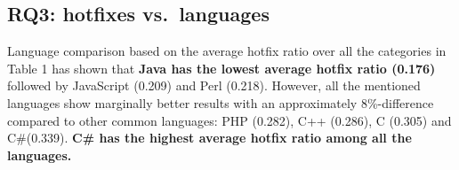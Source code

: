 \documentclass{sig-alternate}
\begin{document}



\subsection{RQ3: hotfixes vs.\ languages}
Language comparison based on the average hotfix ratio over all the categories in Table 1 has shown that \textbf{Java has the lowest average hotfix ratio (0.176)} followed by JavaScript (0.209) and Perl (0.218). However, all the mentioned languages show marginally better results with an approximately 8\%-difference compared to other common languages: PHP (0.282), C++ (0.286), C (0.305) and C\#(0.339). \textbf{C\# has the highest average hotfix ratio among all the languages.}
\end{document}
